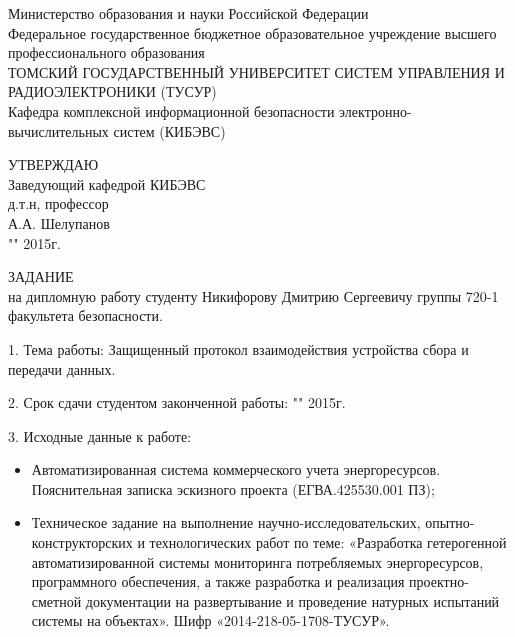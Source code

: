 \newpage
{}

\begin{center}
Министерство образования и науки Российской Федерации\\
Федеральное государственное бюджетное образовательное учреждение высшего профессионального образования\\
ТОМСКИЙ ГОСУДАРСТВЕННЫЙ УНИВЕРСИТЕТ СИСТЕМ УПРАВЛЕНИЯ И РАДИОЭЛЕКТРОНИКИ (ТУСУР)\\
Кафедра комплексной информационной безопасности электронно-вычислительных систем (КИБЭВС)\\
\end{center}

\hfill
\begin{minipage}[right]{0.4\linewidth}
\begin{singlespace}
 УТВЕРЖДАЮ \\
 Заведующий кафедрой КИБЭВС \\
 д.т.н, профессор \\
 \underline{\hspace{2.5cm}}А.А. Шелупанов \\
 "\underline{\hspace{1cm}}"\underline{\hspace{3cm}} 2015г.\\
\end{singlespace} 
\end{minipage}

\vspace{1cm}

\hfill ЗАДАНИЕ \hfill \\
на дипломную работу студенту Никифорову Дмитрию Сергеевичу группы 720-1 факультета безопасности.

1. Тема работы: Защищенный протокол взаимодействия устройства сбора и передачи данных.

2. Срок сдачи студентом законченной работы: "\underline{\hspace{1cm}}"\underline{\hspace{3cm}} 2015г.

3. Исходные данные к работе:

\begin{itemize}
 \item Автоматизированная система коммерческого учета энергоресурсов. Пояснительная записка эскизного проекта (ЕГВА.425530.001 ПЗ);
 \item Техническое задание на выполнение научно-исследовательских, опытно-конструкторских и технологических работ по теме: «Разработка гетерогенной автоматизированной системы мониторинга потребляемых энергоресурсов, программного обеспечения, а также разработка и реализация проектно-сметной документации на развертывание и проведение натурных испытаний системы на объектах». Шифр «2014-218-05-1708-ТУСУР».
\end{itemize}

